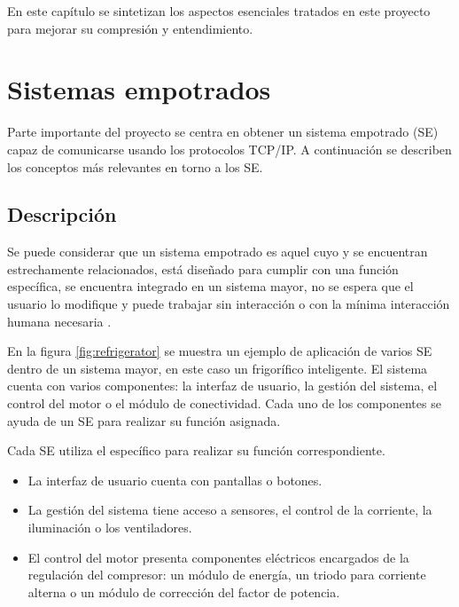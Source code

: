 En este capítulo se sintetizan los aspectos esenciales tratados en este proyecto
para mejorar su compresión y entendimiento.



\section{Sistemas empotrados}{\label{sec:se}}
Parte importante del proyecto se centra en obtener un sistema empotrado (SE)
capaz de comunicarse usando los protocolos TCP/IP. A continuación se describen
los conceptos más relevantes en torno a los SE.


\subsection{Descripción}{\label{sec:se-desc}}
Se puede considerar que un sistema empotrado es aquel cuyo
 y  se encuentran estrechamente
relacionados, está diseñado para cumplir con una función específica, se
encuentra integrado en un sistema mayor, no se espera que el usuario lo
modifique y puede trabajar sin interacción o con la mínima interacción humana
necesaria \cite{jimenez2014}.


En la figura \ref{fig:refrigerator} se muestra un ejemplo de aplicación de
varios SE dentro de un sistema mayor, en este caso un frigorífico inteligente.
El sistema cuenta con varios componentes: la interfaz de usuario, la gestión del
sistema, el control del motor o el módulo de conectividad. Cada uno de los
componentes se ayuda de un SE para realizar su función asignada.

Cada SE utiliza el  específico para realizar su función
correspondiente.
\begin{itemize}
  \item La interfaz de usuario cuenta con pantallas o botones.
  \item La gestión del sistema tiene acceso a sensores, el control de la
  corriente, la iluminación o los ventiladores.
  \item El control del motor presenta componentes eléctricos encargados de la
  regulación del compresor: un módulo de energía, un triodo para corriente
  alterna o un módulo de corrección del factor de potencia.
\end{itemize}

